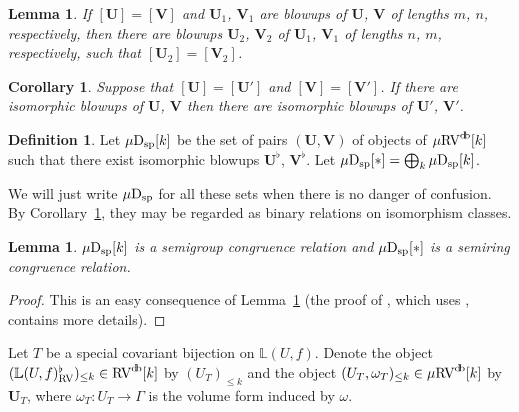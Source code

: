 \documentclass[12pt]{amsart}
\theoremstyle{plain}
\newtheorem{cor}[thm]{Corollary}
\newtheorem{lem}[thm]{Lemma}
\theoremstyle{definition}
\newtheorem{defn}[thm]{Definition}
\theoremstyle{remark}
\numberwithin{equation}{section}
\theoremstyle{plain}
\newcommand{\RV}{\textup{RV}}
\newcommand{\0}{\emptyset}
\newcommand{\bb}[1]{\mathbb{#1}}
\newcommand{\fun}{\longrightarrow}
\newcommand{\mRV}{{\mu}{\RV}}
\newcommand{\dsp}{\textup{D}_{\textup{sp}}}
\newcommand{\mispdb}{\mu \dsp}
\DeclareMathOperator{\db}{d \! b}
\begin{document}
\begin{lem}\label{blowup:equi:class:coa}
If $[\bm U] = [\bm V]$ and $\bm U_1$, $\bm V_1$ are blowups of $\bm U$, $\bm V$ of lengths $m$, $n$, respectively, then there are blowups $\bm U_2$, $\bm V_2$ of $\bm U_1$, $\bm V_1$ of lengths $n$, $m$, respectively, such that $[\bm U_2] = [\bm V_2]$.
\end{lem}

\begin{cor}\label{blowup:equi:class}
Suppose that $[\bm U] = [\bm U']$ and $[\bm V] = [\bm V']$. If there are isomorphic blowups of $\bm U$, $\bm V$ then there are isomorphic blowups of $\bm U'$, $\bm V'$.
\end{cor}

\begin{defn}
Let $\mispdb[k]$ be the set of pairs $(\bm U, \bm V)$ of objects of $\mRV^{\db}[k]$ such that there exist isomorphic blowups $\bm U^{\flat}$, $\bm V^{\flat}$. Let $\mispdb[*] = \bigoplus_{k} \mispdb[k]$.
\end{defn}

We will just write $\mispdb$ for all these sets when there is no danger of confusion. By Corollary~\ref{blowup:equi:class}, they may be regarded as binary relations on isomorphism classes.


\begin{lem}\label{isp:congruence:vol}
$\mispdb[k]$ is a semigroup congruence relation and $\mispdb[*]$ is a semiring congruence relation.
\end{lem}
\begin{proof}
This is an easy consequence of Lemma~\ref{blowup:equi:class:coa} (the proof of \cite[Lemma~6.8]{Yin:int:acvf}, which uses \cite[Lemma~6.5]{Yin:int:acvf}, contains more details).
\end{proof}


Let  $T$ be a special covariant bijection on $\bb L (U,f)$. Denote the object $(\mathbb{L} (U,f)^\flat_{\RV})_{\leq k} \in \RV^{\db}[k]$ by $(U_{T})_{\leq k}$ and  the object $(U_{T}, \omega_T)_{\leq k} \in \mRV^{\db}[k]$ by $\bm U_{T}$, where $\omega_T : U_{T} \fun \Gamma$ is the volume form induced by $\omega$.
\end{document}
